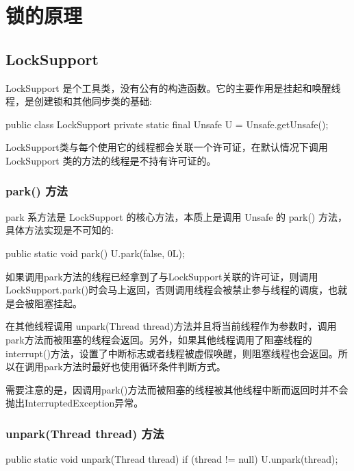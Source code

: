 \section{锁的原理}
\subsection{LockSupport}

LockSupport 是个工具类，没有公有的构造函数。它的主要作用是挂起和唤醒线程，是创建锁和其他同步类的基础:

\begin{Java}
public class LockSupport {
    private static final Unsafe U = Unsafe.getUnsafe();
}
\end{Java}

LockSupport类与每个使用它的线程都会关联一个许可证，在默认情况下调用 LockSupport 类的方法的线程是不持有许可证的。

\subsubsection*{park() 方法}

park 系方法是 LockSupport 的核心方法，本质上是调用 Unsafe 的 park() 方法，具体方法实现是不可知的:

\begin{Java}
public static void park() {
    U.park(false, 0L);
}
\end{Java}

如果调用park方法的线程已经拿到了与LockSupport关联的许可证，则调用LockSupport.park()时会马上返回，否则调用线程会被禁止参与线程的调度，也就是会被阻塞挂起。

在其他线程调用 unpark(Thread thread)方法并且将当前线程作为参数时，调用park方法而被阻塞的线程会返回。另外，如果其他线程调用了阻塞线程的interrupt()方法，设置了中断标志或者线程被虚假唤醒，则阻塞线程也会返回。所以在调用park方法时最好也使用循环条件判断方式。

需要注意的是，因调用park()方法而被阻塞的线程被其他线程中断而返回时并不会抛出InterruptedException异常。

\subsubsection*{unpark(Thread thread) 方法}

\begin{Java}
public static void unpark(Thread thread) {
    if (thread != null)
        U.unpark(thread);
}
\end{Java}


